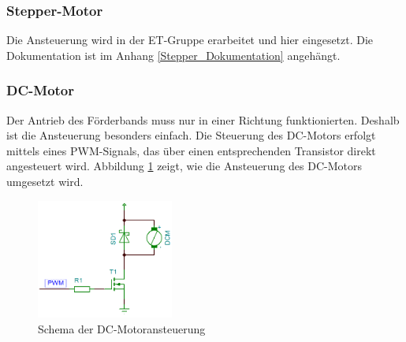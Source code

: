 \subsubsection{Stepper-Motor}
    Die Ansteuerung wird in der ET-Gruppe erarbeitet und hier eingesetzt. Die Dokumentation ist im Anhang \ref{Stepper_Dokumentation} angehängt.
\subsubsection{DC-Motor}
    Der Antrieb des Förderbands muss nur in einer Richtung funktionierten. Deshalb ist die Ansteuerung besonders einfach. Die Steuerung des DC-Motors erfolgt mittels eines PWM-Signals, das über einen entsprechenden Transistor direkt angesteuert wird. Abbildung \ref{fig:Schema_DC-Motor} zeigt, wie die Ansteuerung des DC-Motors umgesetzt wird.
    \begin{figure}[h!] %
    	\centering
    	\includegraphics[width=0.4\textwidth]{Enddokumentation/Loesungskonzept/Bilder/SchemaDcMotor.png}
    	\caption{Schema der DC-Motoransteuerung}
    	\label{fig:Schema_DC-Motor}
    \end{figure}